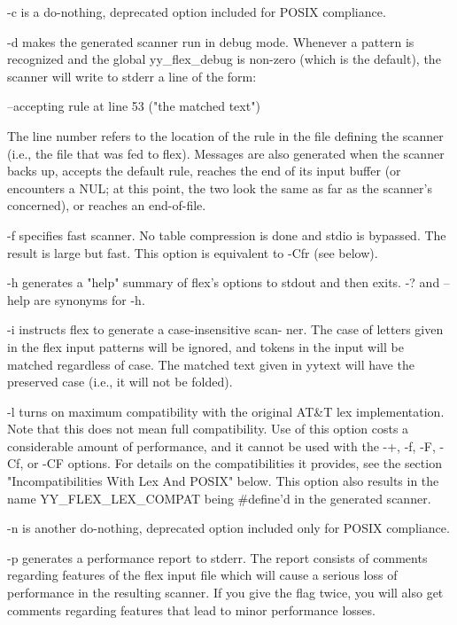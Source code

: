 \documentclass[12pt,spanish,twocolumn,lettersize]{article}
\begin{document}
{       -c     is  a  do-nothing,  deprecated  option included for
	      POSIX compliance.

       -d     makes the generated  scanner  run	 in  debug  mode.
	      Whenever	a  pattern  is	recognized and the global
	      yy_flex_debug is non-zero (which is  the	default),
	      the  scanner  will  write	 to  stderr a line of the
	      form:

		  --accepting rule at line 53 ("the matched text")

	      The line number refers to the location of the  rule
	      in  the  file  defining the scanner (i.e., the file
	      that was fed to flex).  Messages are also generated
	      when  the	 scanner  backs	 up,  accepts the default
	      rule, reaches the	 end  of  its  input  buffer  (or
	      encounters  a  NUL; at this point, the two look the
	      same as far as the scanner's concerned), or reaches
	      an end-of-file.

       -f     specifies	 fast  scanner.	  No table compression is
	      done and stdio is bypassed.  The	result	is  large
	      but  fast.   This option is equivalent to -Cfr (see
	      below).

       -h     generates a "help" summary  of  flex's  options  to
	      stdout and then exits.  -?  and --help are synonyms
	      for -h.

       -i     instructs flex to generate a case-insensitive scan-
	      ner.   The  case of letters given in the flex input
	      patterns will be ignored, and tokens in  the  input
	      will  be	matched	 regardless of case.  The matched
	      text given in yytext will have the  preserved  case
	      (i.e., it will not be folded).

       -l     turns  on	 maximum  compatibility with the original
	      AT&T lex implementation.	Note that this	does  not
	      mean  full compatibility.	 Use of this option costs
	      a considerable amount of performance, and it cannot
	      be  used	with the -+, -f, -F, -Cf, or -CF options.
	      For details on the compatibilities it provides, see
	      the  section "Incompatibilities With Lex And POSIX"
	      below.   This  option  also  results  in	the  name
	      YY_FLEX_LEX_COMPAT being #define'd in the generated
	      scanner.

       -n     is another do-nothing, deprecated	 option	 included
	      only for POSIX compliance.

       -p     generates	 a  performance	 report	 to  stderr.  The
	      report consists of comments regarding  features  of
	      the flex input file which will cause a serious loss
	      of performance in the resulting  scanner.	  If  you
	      give  the	 flag  twice,  you will also get comments
	      regarding features that lead to  minor  performance
	      losses.

}
\end{document}

